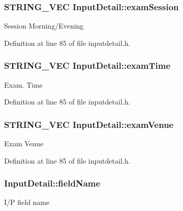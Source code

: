 \hypertarget{classInputDetail_a4501d1379c278965497abf21d369ad9e}{
\subsubsection[{exam\-Session}]{\setlength{\rightskip}{0pt plus 5cm}\-S\-T\-R\-I\-N\-G\-\_\-\-V\-E\-C {\bf \-Input\-Detail\-::exam\-Session}}}\label{db/d6e/classInputDetail_a4501d1379c278965497abf21d369ad9e}
\-Session \-Morning/\-Evening 

\-Definition at line 85 of file inputdetail.\-h.

\hypertarget{classInputDetail_a847dd8bb2f0c43960746cfa4d2310a15}{
\subsubsection[{exam\-Time}]{\setlength{\rightskip}{0pt plus 5cm}\-S\-T\-R\-I\-N\-G\-\_\-\-V\-E\-C {\bf \-Input\-Detail\-::exam\-Time}}}\label{db/d6e/classInputDetail_a847dd8bb2f0c43960746cfa4d2310a15}
\-Exam. \-Time 

\-Definition at line 85 of file inputdetail.\-h.

\hypertarget{classInputDetail_a695928668a413ac052776c0b6cb27501}{
\subsubsection[{exam\-Venue}]{\setlength{\rightskip}{0pt plus 5cm}\-S\-T\-R\-I\-N\-G\-\_\-\-V\-E\-C {\bf \-Input\-Detail\-::exam\-Venue}}}\label{db/d6e/classInputDetail_a695928668a413ac052776c0b6cb27501}
\-Exam \-Venue 

\-Definition at line 85 of file inputdetail.\-h.

\hypertarget{classInputDetail_ac6f85380c5152c406d483726382c4798}{
\subsubsection[{field\-Name}]{ {\bf \-Input\-Detail\-::field\-Name}}}\label{db/d6e/classInputDetail_ac6f85380c5152c406d483726382c4798}
\-I/\-P field name 

